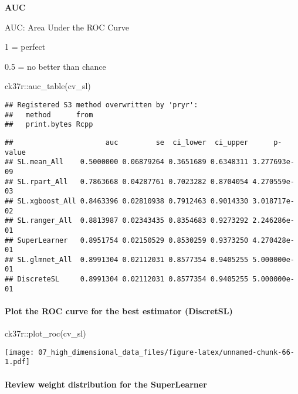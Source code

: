 \documentclass[
]{book}
\newenvironment{Shaded}{\begin{snugshade}}{\end{snugshade}}
\newcommand{\FunctionTok}[1]{\textcolor[rgb]{0.00,0.00,0.00}{#1}}
\newcommand{\NormalTok}[1]{#1}
\newcommand{\SpecialCharTok}[1]{\textcolor[rgb]{0.00,0.00,0.00}{#1}}
\begin{document}
\textbf{AUC}

AUC: Area Under the ROC Curve

1 = perfect

0.5 = no better than chance

\begin{Shaded}
\begin{Highlighting}[]
\NormalTok{ck37r}\SpecialCharTok{::}\FunctionTok{auc\_table}\NormalTok{(cv\_sl)}
\end{Highlighting}
\end{Shaded}

\begin{verbatim}
## Registered S3 method overwritten by 'pryr':
##   method      from
##   print.bytes Rcpp
\end{verbatim}

\begin{verbatim}
##                      auc         se  ci_lower  ci_upper      p-value
## SL.mean_All    0.5000000 0.06879264 0.3651689 0.6348311 3.277693e-09
## SL.rpart_All   0.7863668 0.04287761 0.7023282 0.8704054 4.270559e-03
## SL.xgboost_All 0.8463396 0.02810938 0.7912463 0.9014330 3.018717e-02
## SL.ranger_All  0.8813987 0.02343435 0.8354683 0.9273292 2.246286e-01
## SuperLearner   0.8951754 0.02150529 0.8530259 0.9373250 4.270428e-01
## SL.glmnet_All  0.8991304 0.02112031 0.8577354 0.9405255 5.000000e-01
## DiscreteSL     0.8991304 0.02112031 0.8577354 0.9405255 5.000000e-01
\end{verbatim}

\hypertarget{plot-the-roc-curve-for-the-best-estimator-discretsl}{%
\paragraph{Plot the ROC curve for the best estimator (DiscretSL)}\label{plot-the-roc-curve-for-the-best-estimator-discretsl}}

\begin{Shaded}
\begin{Highlighting}[]
\NormalTok{ck37r}\SpecialCharTok{::}\FunctionTok{plot\_roc}\NormalTok{(cv\_sl)}
\end{Highlighting}
\end{Shaded}

\texttt{[image: 07\_high\_dimensional\_data\_files/figure-latex/unnamed-chunk-66-1.pdf]}

\hypertarget{review-weight-distribution-for-the-superlearner}{%
\paragraph{Review weight distribution for the SuperLearner}\label{review-weight-distribution-for-the-superlearner}}
\end{document}
